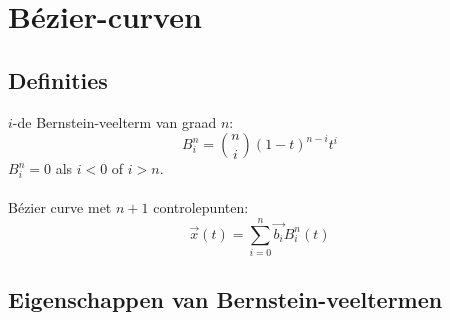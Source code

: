 \documentclass[tmi_notities.tex]{subfiles}
\begin{document}
\chapter{B\'ezier-curven}
\section{Definities}
$i$-de Bernstein-veelterm van graad $n$:
\[
B_{i}^{n} = \binom{n}{i}(1-t)^{n-i}t^{i}
\]
$B_{i}^{n} = 0$ als $i < 0$ of $i > n$.\\\\
B\'ezier curve met $n+1$ controlepunten:
\[
\vec{x}(t) = \sum_{i=0}^n\vec{b_{i}}B_{i}^{n}(t)
\]

\section{Eigenschappen van Bernstein-veeltermen}
\end{document}
